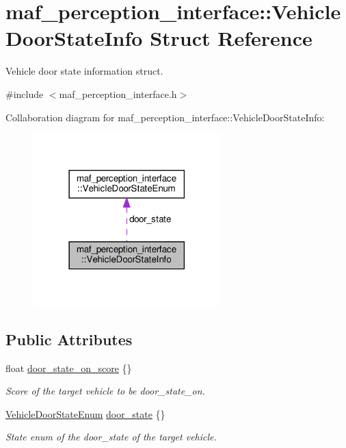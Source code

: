 \hypertarget{structmaf__perception__interface_1_1VehicleDoorStateInfo}{}\section{maf\+\_\+perception\+\_\+interface\+:\+:Vehicle\+Door\+State\+Info Struct Reference}
\label{structmaf__perception__interface_1_1VehicleDoorStateInfo}


Vehicle door state information struct.  




{\ttfamily \#include $<$maf\+\_\+perception\+\_\+interface.\+h$>$}



Collaboration diagram for maf\+\_\+perception\+\_\+interface\+:\+:Vehicle\+Door\+State\+Info\+:\nopagebreak
\begin{figure}[H]
\begin{center}
\leavevmode
\includegraphics[width=206pt]{structmaf__perception__interface_1_1VehicleDoorStateInfo__coll__graph}
\end{center}
\end{figure}
\subsection*{Public Attributes}
\begin{DoxyCompactItemize}
\item 
float \hyperlink{structmaf__perception__interface_1_1VehicleDoorStateInfo_acbe880bca4247c184984fe589de1b2a5}{door\+\_\+state\+\_\+on\+\_\+score} \{\}
\begin{DoxyCompactList}\small\item\em Score of the target vehicle to be door\+\_\+state\+\_\+on. \end{DoxyCompactList}\item 
\hyperlink{structmaf__perception__interface_1_1VehicleDoorStateEnum}{Vehicle\+Door\+State\+Enum} \hyperlink{structmaf__perception__interface_1_1VehicleDoorStateInfo_a638ab4ca908e0d1791a81ed98a50fd6a}{door\+\_\+state} \{\}
\begin{DoxyCompactList}\small\item\em State enum of the door\+\_\+state of the target vehicle. \end{DoxyCompactList}\end{DoxyCompactItemize}


